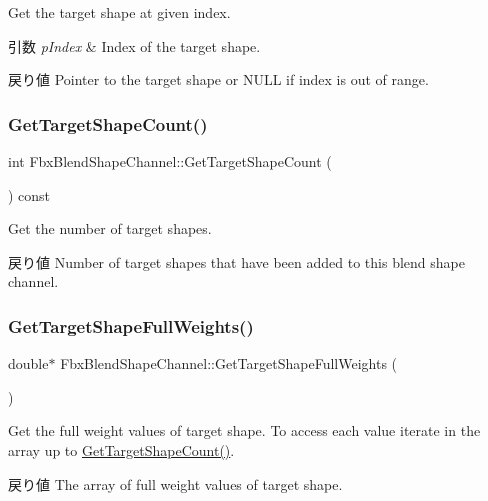 Get the target shape at given index. 
\begin{DoxyParams}{引数}
{\em p\+Index} & Index of the target shape. \\
\hline
\end{DoxyParams}
\begin{DoxyReturn}{戻り値}
Pointer to the target shape or {\ttfamily N\+U\+LL} if index is out of range. 
\end{DoxyReturn}
\mbox{\label{class_fbx_blend_shape_channel_a61e052b389537fcb7db318853c17160c}} 
\subsubsection{\texorpdfstring{Get\+Target\+Shape\+Count()}{GetTargetShapeCount()}}
{\footnotesize\ttfamily int Fbx\+Blend\+Shape\+Channel\+::\+Get\+Target\+Shape\+Count (\begin{DoxyParamCaption}{ }\end{DoxyParamCaption}) const}

Get the number of target shapes. \begin{DoxyReturn}{戻り値}
Number of target shapes that have been added to this blend shape channel. 
\end{DoxyReturn}
\mbox{\label{class_fbx_blend_shape_channel_af3d0ae44fb85c9bdc485a7c607190cfd}} 
\subsubsection{\texorpdfstring{Get\+Target\+Shape\+Full\+Weights()}{GetTargetShapeFullWeights()}}
{\footnotesize\ttfamily double$\ast$ Fbx\+Blend\+Shape\+Channel\+::\+Get\+Target\+Shape\+Full\+Weights (\begin{DoxyParamCaption}{ }\end{DoxyParamCaption})}

Get the full weight values of target shape. To access each value iterate in the array up to \hyperlink{class_fbx_blend_shape_channel_a61e052b389537fcb7db318853c17160c}{Get\+Target\+Shape\+Count()}. \begin{DoxyReturn}{戻り値}
The array of full weight values of target shape. 
\end{DoxyReturn}
\mbox{\label{class_fbx_blend_shape_channel_a75e572afbee5b3c5c635932282b86473}} 
